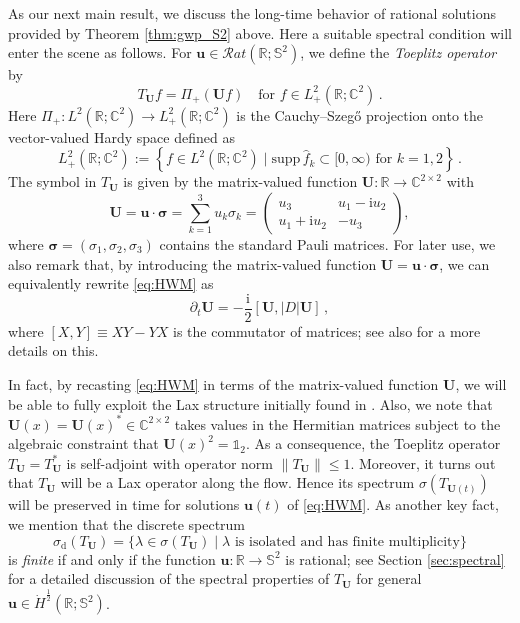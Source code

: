 \documentclass[11pt,reqno]{amsart}
\theoremstyle{definition}
\theoremstyle{remark}
\theoremstyle{remark}
\numberwithin{equation}{section}
\newcommand{\C}{\mathbb{C}}
\newcommand{\R}{\mathbb{R}}
\newcommand{\Ss}{\mathbb{S}}
\newcommand{\pt}{\partial}
\newcommand{\be}{\begin{equation}}
\newcommand{\ee}{\end{equation}}
\newcommand{\ii}{\mathrm{i}}
\newcommand{\uu}{\mathbf{u}}
\newcommand{\Ub}{\mathbf{U}}
\begin{document}
As our next main result, we discuss the long-time behavior of rational solutions provided by Theorem \ref{thm:gwp_S2} above. Here a suitable spectral condition will enter the scene as follows. For $\uu \in \mathcal{R}at(\R; \Ss^2)$, we define the {\em Toeplitz operator}  by
$$
T_{\Ub} f = \Pi_+ ( \Ub f) \quad \mbox{for $f \in L^2_+(\R; \C^2)$} \, .
$$
Here $\Pi_+ : L^2(\R; \C^2) \to L^2_+(\R; \C^2)$ is the Cauchy--Szeg\H{o} projection onto the vector-valued Hardy space defined as
$$
L^2_+(\R; \C^2) := \left \{ f \in L^2(\R; \C^2) \mid \mbox{$\mathrm{supp} \, \widehat{f}_k \subset [0, \infty)$ for $k=1,2$} \right \}\, . 
$$
The symbol in $T_\Ub$ is given by the matrix-valued function $\Ub : \R \to \C^{2 \times 2}$ with
\be
\Ub = \uu  \cdot \bm{\sigma} = \sum_{k=1}^3 u_k \sigma_k = \left ( \begin{array}{cc} u_3 & u_1 - \ii u_2 \\ u_1 + \ii u_2 & -u_3 \end{array} \right ) ,
\ee
where $\bm{\sigma}=(\sigma_1, \sigma_2, \sigma_3)$ contains the standard Pauli matrices. For later use, we also remark that, by introducing the matrix-valued function $\Ub = \uu \cdot \bm{\sigma}$, we can equivalently rewrite \eqref{eq:HWM} as 
\be
\pt_t \Ub = -\frac{\ii}{2} [\Ub, |D| \Ub] \, ,
\ee
where $[X,Y] \equiv XY-YX$ is the commutator of matrices; see also \cite{GeLe-18} for a more details on this.

In fact, by recasting \eqref{eq:HWM} in terms of the matrix-valued function $\Ub$, we will be able to fully exploit the Lax structure initially found in \cite{GeLe-18}. Also, we note that $\Ub(x) =\Ub(x)^* \in \C^{2 \times 2}$ takes values in the Hermitian matrices subject to the algebraic constraint that $\Ub(x)^2 = \mathds{1}_2$. As a consequence, the Toeplitz operator $T_\Ub=T_\Ub^*$ is self-adjoint with operator norm $\| T_\Ub \| \leq 1$. Moreover, it turns out that  $T_\Ub$ will be a Lax operator along the flow. Hence its spectrum $\sigma(T_{\Ub(t)})$ will be preserved in time for solutions $\uu(t)$ of \eqref{eq:HWM}. As another key fact, we mention  that the discrete spectrum
$$
\sigma_{\mathrm{d}}(T_\Ub) = \{ \lambda \in \sigma(T_{\Ub}) \mid \mbox{$\lambda$ is isolated and has finite multiplicity} \}
$$
is {\em finite} if and only if the function $\uu : \R \to \Ss^2$ is rational; see Section \ref{sec:spectral} for a detailed discussion of the spectral properties of $T_{\Ub}$ for general $\uu \in \dot{H}^{\frac 1 2}(\R; \Ss^2)$.
\end{document}
